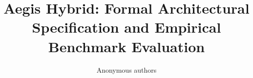 \title{\textbf{Aegis Hybrid: Formal Architectural Specification and Empirical Benchmark Evaluation}}

\author{Anonymous authors}
